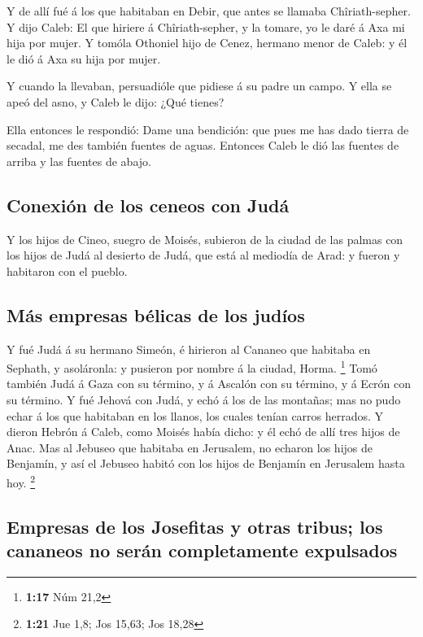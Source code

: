  Y de allí fué á los que habitaban en Debir, que antes se
llamaba Chîriath-sepher.  Y dijo Caleb: El que hiriere á
Chîriath-sepher, y la tomare, yo le daré á Axa mi hija por mujer.
 Y tomóla Othoniel hijo de Cenez, hermano menor de Caleb:
y él le dió á Axa su hija por mujer.

 Y cuando la llevaban, persuadióle que pidiese á su padre
un campo. Y ella se apeó del asno, y Caleb le dijo: ¿Qué tienes?

 Ella entonces le respondió: Dame una bendición: que pues
me has dado tierra de secadal, me des también fuentes de aguas. Entonces
Caleb le dió las fuentes de arriba y las fuentes de abajo.

\hypertarget{conexiuxf3n-de-los-ceneos-con-juduxe1}{%
\subsection{Conexión de los ceneos con
Judá}\label{conexiuxf3n-de-los-ceneos-con-juduxe1}}

 Y los hijos de Cineo, suegro de Moisés, subieron de la
ciudad de las palmas con los hijos de Judá al desierto de Judá, que está
al mediodía de Arad: y fueron y habitaron con el pueblo.

\hypertarget{muxe1s-empresas-buxe9licas-de-los-juduxedos}{%
\subsection{Más empresas bélicas de los
judíos}\label{muxe1s-empresas-buxe9licas-de-los-juduxedos}}

 Y fué Judá á su hermano Simeón, é hirieron al Cananeo
que habitaba en Sephath, y asoláronla: y pusieron por nombre á la
ciudad, Horma. \footnote{\textbf{1:17} Núm 21,2}  Tomó
también Judá á Gaza con su término, y á Ascalón con su término, y á
Ecrón con su término.  Y fué Jehová con Judá, y echó á
los de las montañas; mas no pudo echar á los que habitaban en los
llanos, los cuales tenían carros herrados.  Y dieron
Hebrón á Caleb, como Moisés había dicho: y él echó de allí tres hijos de
Anac.  Mas al Jebuseo que habitaba en Jerusalem, no
echaron los hijos de Benjamín, y así el Jebuseo habitó con los hijos de
Benjamín en Jerusalem hasta hoy. \footnote{\textbf{1:21} Jue 1,8; Jos
  15,63; Jos 18,28}

\hypertarget{empresas-de-los-josefitas-y-otras-tribus-los-cananeos-no-seruxe1n-completamente-expulsados}{%
\subsection{Empresas de los Josefitas y otras tribus; los cananeos no
serán completamente
expulsados}\label{empresas-de-los-josefitas-y-otras-tribus-los-cananeos-no-seruxe1n-completamente-expulsados}}

